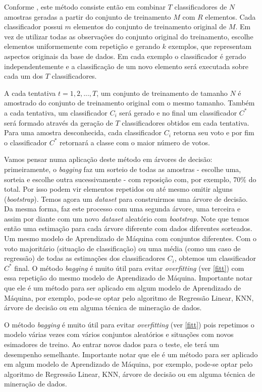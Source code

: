 \documentclass[
  openany]{book}
\begin{document}
Conforme \citep{oshiro2013abordagem}, este método consiste então em combinar \(T\) classificadores de \(N\) amostras geradas a partir do conjunto de treinamento \(M\) com \(R\) elementos. Cada classificador possui \(m\) elementos do conjunto de treinamento original de \(M\). Em vez de utilizar todas as observações do conjunto original do treinamento, escolhe elementos uniformemente com repetição e gerando \(k\) exemplos, que representam aspectos originais da base de dados. Em cada exemplo o classificador é gerado independentemente e a classificação de um novo elemento será executada sobre cada um dos \(T\) classificadores.

A cada tentativa \(t=1,2,...,T\), um conjunto de treinamento de tamanho \(N\) é amostrado do conjunto de treinamento original com o mesmo tamanho. Também a cada tentativa, um classificador \(C_i\) será gerado e no final um classificador \(C^*\) será formado através da geração de \(T\) classificadores obtidos em cada tentativa. Para uma amostra desconhecida, cada classificador \(C_i\) retorna seu voto e por fim o classificador \(C^*\) retornará a classe com o maior número de votos.

Vamos pensar numa aplicação deste método em árvores de decisão: primeiramente, o \emph{bagging} faz um sorteio de todas as amostras - escolhe uma, sorteia e escolhe outra sucessivamente - com reposição com, por exemplo, 70\% do total. Por isso podem vir elementos repetidos ou até mesmo omitir alguns (\emph{bootstrap}). Temos agora um \emph{dataset} para construirmos uma árvore de decisão. Da mesma forma, faz este processo com uma segunda árvore, uma terceira e assim por diante com um novo \emph{dataset} aleatório com \emph{bootstrap}. Note que temos então uma estimação para cada árvore diferente com dados diferentes sorteados. Um mesmo modelo de Aprendizado de Máquina com conjuntos diferentes. Com o voto majoritário (situação de classificação) ou uma média (como um caso de regressão) de todas as estimações dos classificadores \(C_i\), obtemos um classificador \(C^*\) final. O método \emph{bagging} é muito útil para evitar \emph{overfitting} (ver \ref{fitt}) com essa repetição do mesmo modelo de Aprendizado de Máquina. Importante notar que ele é um método para ser aplicado em algum modelo de Aprendizado de Máquina, por exemplo, pode-se optar pelo algoritmo de Regressão Linear, KNN, árvore de decisão ou em alguma técnica de mineração de dados.

O método \emph{bagging} é muito útil para evitar \emph{overfitting} (ver \ref{fitt}) pois repetimos o modelo várias vezes com vários conjuntos aleatórios e situações com novos esimadores de treino. Ao entrar novos dados para o teste, ele terá um desempenho semelhante. Importante notar que ele é um método para ser aplicado em algum modelo de Aprendizado de Máquina, por exemplo, pode-se optar pelo algoritmo de Regressão Linear, KNN, árvore de decisão ou em alguma técnica de mineração de dados.
\end{document}

